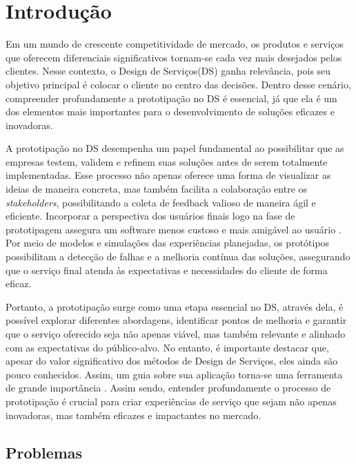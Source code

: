 \chapter[Introdução]{Introdução}


Em um mundo de crescente competitividade de mercado, os produtos e serviços que oferecem diferenciais significativos tornam-se cada vez mais desejados pelos clientes. Nesse contexto, o Design de Serviços(DS) ganha relevância, pois seu objetivo principal é colocar o cliente no centro das decisões. Dentro desse cenário, compreender profundamente a prototipação no DS é essencial, já que ela é um dos elementos mais importantes para o desenvolvimento de soluções eficazes e inovadoras.

A prototipação no DS desempenha um papel fundamental ao possibilitar que as empresas testem, validem e refinem suas soluções antes de serem totalmente implementadas. Esse processo não apenas oferece uma forma de visualizar as ideias de maneira concreta, mas também facilita a colaboração entre os \textit{stakeholders}, possibilitando a coleta de feedback valioso de maneira ágil e eficiente. Incorporar a perspectiva dos usuários finais logo na fase de prototipagem assegura um software menos custoso e mais amigável ao usuário \cite{Mattjus2023}. Por meio de modelos e simulações das experiências planejadas, os protótipos possibilitam a detecção de falhas e a melhoria contínua das soluções, assegurando que o serviço final atenda às expectativas e necessidades do cliente de forma eficaz.

Portanto, a prototipação surge como uma etapa essencial no DS, através dela, é possível explorar diferentes abordagens, identificar pontos de melhoria e garantir que o serviço oferecido seja não apenas viável, mas também relevante e alinhado com as expectativas do público-alvo.  No entanto, é importante destacar que, apesar do valor significativo dos métodos de Design de Serviços, eles ainda são pouco conhecidos. Assim, um guia sobre sua aplicação torna-se uma ferramenta de grande importância \cite{Mattjus2023}. Assim sendo, entender profundamente o processo de prototipação é crucial para criar experiências de serviço que sejam não apenas inovadoras, mas também eficazes e impactantes no mercado.


\section {Problemas}

